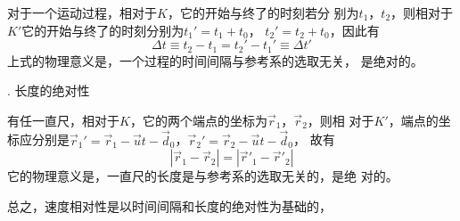 对于一个运动过程，相对于$K$，它的开始与终了的时刻若分
别为$t_1$，$t_2$，则相对于$K'$它的开始与终了的时刻分别为$t_1'=t_1+t_0$，
$t_2'=t_2+t_0$，因此有
\begin{equation}\label{eqn:02.05.05}
    \Delta t \equiv t_2 - t_1 = t_2' - t_1' \equiv \Delta t'
\end{equation}
上式的物理意义是，一个过程的时间间隔与参考系的选取无关，
是绝对的。

. 长度的绝对性 \normalfont

有任一直尺，相对于$K$，它的两个端点的坐标为$\vec{r}_1$，$\vec{r}_2$，则相
对于$K'$，端点的坐标应分别是$\vec{r}_1' = \vec{r}_1 - \vec{u} t - \vec{d}_0$，$\vec{r}_2' = \vec{r}_2 - \vec{u} t - \vec{d}_0$，
故有
\begin{equation}\label{eqn:02.05.06}
    |\vec{r}_1 - \vec{r}_2| = |\vec{r}'_1 - \vec{r}'_2|
\end{equation}
它的物理意义是，一直尺的长度是与参考系的选取无关的，是绝
对的。

总之，速度相对性是以时间间隔和长度的绝对性为基础的，
